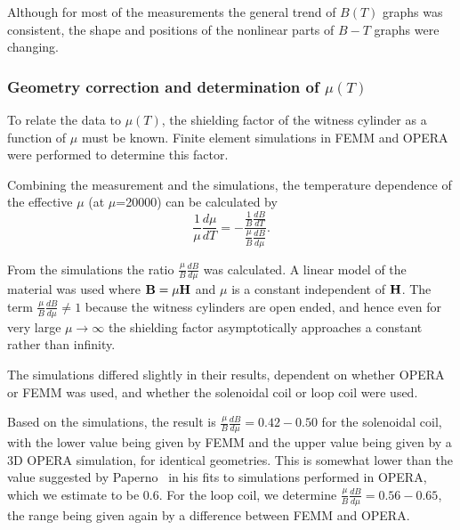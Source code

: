 Although for most of the measurements the general trend of $B(T)$
graphs was consistent, the shape and positions of the nonlinear parts
of $B-T$ graphs were changing.







\subsubsection{Geometry correction and determination of $\mu(T)$}

To relate the data to $\mu(T)$, the shielding factor of the witness
cylinder as a function of $\mu$ must be known.  Finite element
simulations in FEMM and OPERA were performed to determine this factor.

Combining the measurement and the simulations, the temperature
dependence of the effective $\mu$ (at $\mu$=20000) can be calculated
by
\begin{equation}
\frac{1}{\mu}\frac{d\mu}{dT}=-\frac{\frac{1}{B}\frac{dB}{dT}}{\frac{\mu}{B}\frac{dB}{d\mu}}.
\end{equation}

From the simulations the ratio $\frac{\mu}{B} \frac{dB}{d\mu}$ was
calculated.  A linear model of the material was used where
$\bold{B}=\mu \bold{H}$ and $\mu$ is a constant independent of
$\bold{H}$.  The term $\frac{\mu}{B}\frac{dB}{d\mu}\neq 1$ because the
witness cylinders are open ended, and hence even for very large
$\mu\rightarrow\infty$ the shielding factor asymptotically approaches
a constant rather than infinity.

The simulations differed slightly in their results, dependent on
whether OPERA or FEMM was used, and whether the solenoidal coil or
loop coil were used.

Based on the simulations, the result is
$\frac{\mu}{B}\frac{dB}{d\mu}=0.42-0.50$ for the solenoidal coil, with
the lower value being given by FEMM and the upper value being given by
a 3D OPERA simulation, for identical geometries.  This is somewhat
lower than the value suggested by
Paperno~\cite{bib:paperno-open-ended} in his fits to simulations
performed in OPERA, which we estimate to be 0.6.  For the loop coil,
we determine $\frac{\mu}{B}\frac{dB}{d\mu}=0.56-0.65$, the range being
given again by a difference between FEMM and OPERA.





